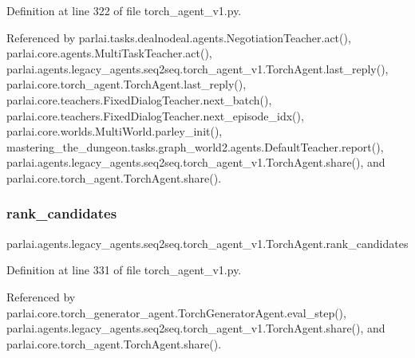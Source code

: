 Definition at line 322 of file torch\+\_\+agent\+\_\+v1.\+py.



Referenced by parlai.\+tasks.\+dealnodeal.\+agents.\+Negotiation\+Teacher.\+act(), parlai.\+core.\+agents.\+Multi\+Task\+Teacher.\+act(), parlai.\+agents.\+legacy\+\_\+agents.\+seq2seq.\+torch\+\_\+agent\+\_\+v1.\+Torch\+Agent.\+last\+\_\+reply(), parlai.\+core.\+torch\+\_\+agent.\+Torch\+Agent.\+last\+\_\+reply(), parlai.\+core.\+teachers.\+Fixed\+Dialog\+Teacher.\+next\+\_\+batch(), parlai.\+core.\+teachers.\+Fixed\+Dialog\+Teacher.\+next\+\_\+episode\+\_\+idx(), parlai.\+core.\+worlds.\+Multi\+World.\+parley\+\_\+init(), mastering\+\_\+the\+\_\+dungeon.\+tasks.\+graph\+\_\+world2.\+agents.\+Default\+Teacher.\+report(), parlai.\+agents.\+legacy\+\_\+agents.\+seq2seq.\+torch\+\_\+agent\+\_\+v1.\+Torch\+Agent.\+share(), and parlai.\+core.\+torch\+\_\+agent.\+Torch\+Agent.\+share().

\mbox{\label{classparlai_1_1agents_1_1legacy__agents_1_1seq2seq_1_1torch__agent__v1_1_1TorchAgent_ab768649f4b4a30eb9a75fedde5a9935f}} 
\subsubsection{\texorpdfstring{rank\+\_\+candidates}{rank\_candidates}}
{\footnotesize\ttfamily parlai.\+agents.\+legacy\+\_\+agents.\+seq2seq.\+torch\+\_\+agent\+\_\+v1.\+Torch\+Agent.\+rank\+\_\+candidates}



Definition at line 331 of file torch\+\_\+agent\+\_\+v1.\+py.



Referenced by parlai.\+core.\+torch\+\_\+generator\+\_\+agent.\+Torch\+Generator\+Agent.\+eval\+\_\+step(), parlai.\+agents.\+legacy\+\_\+agents.\+seq2seq.\+torch\+\_\+agent\+\_\+v1.\+Torch\+Agent.\+share(), and parlai.\+core.\+torch\+\_\+agent.\+Torch\+Agent.\+share().

